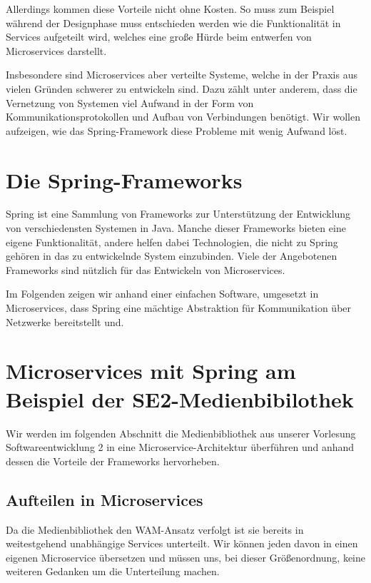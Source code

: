 \documentclass{article}
\begin{document}
Allerdings kommen diese Vorteile nicht ohne Kosten.
So muss zum Beispiel während der Designphase muss entschieden werden wie die Funktionalität in Services aufgeteilt wird, welches eine große Hürde beim entwerfen von Microservices darstellt.\cite{SCASASD}

Insbesondere sind Microservices aber verteilte Systeme, welche in der Praxis aus vielen Gründen schwerer zu entwickeln sind.\cite{MATT}
Dazu zählt unter anderem, dass die Vernetzung von Systemen viel Aufwand in der Form von Kommunikationsprotokollen und Aufbau von Verbindungen benötigt.
Wir wollen aufzeigen, wie das Spring-Framework diese Probleme mit wenig Aufwand löst.

\section{Die Spring-Frameworks}

Spring ist eine Sammlung von Frameworks zur Unterstützung der Entwicklung von verschiedensten Systemen in Java.
Manche dieser Frameworks bieten eine eigene Funktionalität, andere helfen dabei Technologien, die nicht zu Spring gehören in das zu entwickelnde System einzubinden.
Viele der Angebotenen Frameworks sind nützlich für das Entwickeln von Microservices.

Im Folgenden zeigen wir anhand einer einfachen Software, umgesetzt in Microservices, dass Spring eine mächtige Abstraktion für Kommunikation über Netzwerke bereitstellt und.

\section{Microservices mit Spring am Beispiel der SE2-Medienbibilothek}

Wir werden im folgenden Abschnitt die Medienbibliothek aus unserer Vorlesung Softwareentwicklung 2 in eine Microservice-Architektur überführen und anhand dessen die Vorteile der Frameworks hervorheben.

\subsection{Aufteilen in Microservices}

Da die Medienbibliothek den WAM-Ansatz verfolgt ist sie bereits in weitestgehend unabhängige Services unterteilt.
Wir können jeden davon in einen eigenen Microservice übersetzen und müssen uns, bei dieser Größenordnung, keine weiteren Gedanken um die Unterteilung machen.
\end{document}
